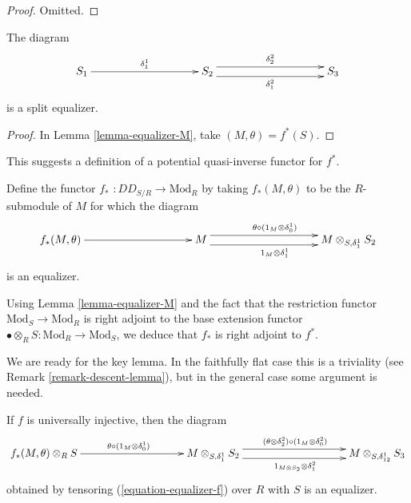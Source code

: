 \begin{proof}
Omitted.
\end{proof}

\begin{lemma}
\label{lemma-equalizer-S}
The diagram
\begin{equation}
\label{equation-equalizer-S}
\xymatrix@C=8pc{
S_1 \ar[r]^{\delta^1_1} &
S_2 \ar@<1ex>[r]^{\delta^2_2} \ar@<-1ex>[r]_{\delta^2_1} & 
S_3
}
\end{equation}
is a split equalizer.
\end{lemma}

\begin{proof}
In Lemma \ref{lemma-equalizer-M}, take $(M, \theta) = f^*(S)$.
\end{proof}

\noindent
This suggests a definition of a potential quasi-inverse functor for $f^*$.

\begin{definition}
\label{definition-pushforward}
Define the functor {\it $f_*$} $: DD_{S/R} \to \text{Mod}_R$ by taking
$f_*(M, \theta)$ to be the $R$-submodule of $M$ for which the diagram
\begin{equation}
\label{equation-equalizer-f}
\xymatrix@C=8pc{f_*(M,\theta) \ar[r] & M \ar@<1ex>^{\theta \circ (1_M \otimes 
\delta_0^1)}[r] \ar@<-1ex>_{1_M \otimes \delta_1^1}[r] & 
M \otimes_{S, \delta_1^1} S_2 
}
\end{equation}
is an equalizer.
\end{definition}

\noindent
Using Lemma \ref{lemma-equalizer-M} and the fact that the restriction functor
$\text{Mod}_S \to \text{Mod}_R$ is right adjoint to the base extension
functor $\bullet \otimes_R S: \text{Mod}_R \to \text{Mod}_S$,
we deduce that $f_*$ is right adjoint to $f^*$.

\medskip\noindent
We are ready for the key lemma. In the faithfully flat case this is a 
triviality (see Remark \ref{remark-descent-lemma}),
but in the general case some argument is needed.

\begin{lemma}
\label{lemma-descent-lemma}
If $f$ is universally injective, then the diagram
\begin{equation}
\label{equation-equalizer-f2}
\xymatrix@C=8pc{
f_*(M, \theta) \otimes_R S
\ar[r]^{\theta \circ (1_M \otimes \delta_0^1)} &
M \otimes_{S, \delta_1^1} S_2 
\ar@<1ex>[r]^{(\theta \otimes \delta_2^2) \circ (1_M \otimes \delta^2_0)}
\ar@<-1ex>[r]_{1_{M \otimes S_2} \otimes \delta^2_1} &
M \otimes_{S, \delta_{12}^1} S_3
}
\end{equation}
obtained by tensoring (\ref{equation-equalizer-f}) over $R$ with $S$ is an 
equalizer.
\end{lemma}


